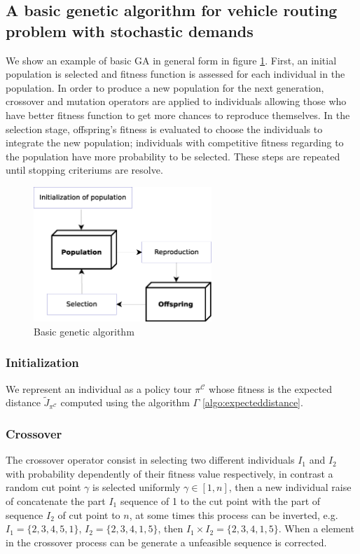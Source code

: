 \subsection{A basic genetic algorithm for vehicle routing problem with stochastic demands}

We show an example of basic GA in general form in figure \ref{fig:ga_basic}. First, an initial population is selected and fitness function is assessed for each individual in the population. In order to produce a new population for the next generation, crossover and mutation operators are applied to individuals allowing those who have better fitness function to get more chances to reproduce themselves. In the selection stage, offspring's fitness is evaluated to choose the individuals to integrate the new population; individuals with competitive fitness regarding to the population have more probability to be selected. These steps are repeated until stopping criteriums are resolve.

\begin{figure}[!htbp]
  \begin{center}
   \includegraphics[width=0.6\textwidth]{Images/Chapter3/ga_basic.eps}
  \end{center}
    \caption{Basic genetic algorithm}\label{fig:ga_basic}
\end{figure}

\subsubsection*{Initialization}

We represent an individual as a policy tour $\pi^\mathcal{C}$ whose fitness is the expected distance $\tilde{J}_{\pi^\mathcal{C}}$ computed using the algorithm $\Gamma$ \ref{algo:expecteddistance}.




\subsubsection*{Crossover}
The crossover operator consist in selecting two different individuals $I_1$ and $I_2$ with probability dependently of their fitness value respectively, in contrast a random cut point $\gamma$ is selected uniformly $\gamma \in [1,n]$, then a new individual raise of concatenate the part $I_1$ sequence of 1 to the cut point with the part of sequence $I_2$ of cut point to $n$, at some times this process can be inverted, e.g. $I_1 = \{2, 3, 4, 5, 1\}$, $I_2= \{2, 3, 4, 1, 5\}$, then $I_1\times I_2 = \{2, 3, 4, 1, 5\}$. When a element in the crossover process can be generate a unfeasible sequence is corrected.

